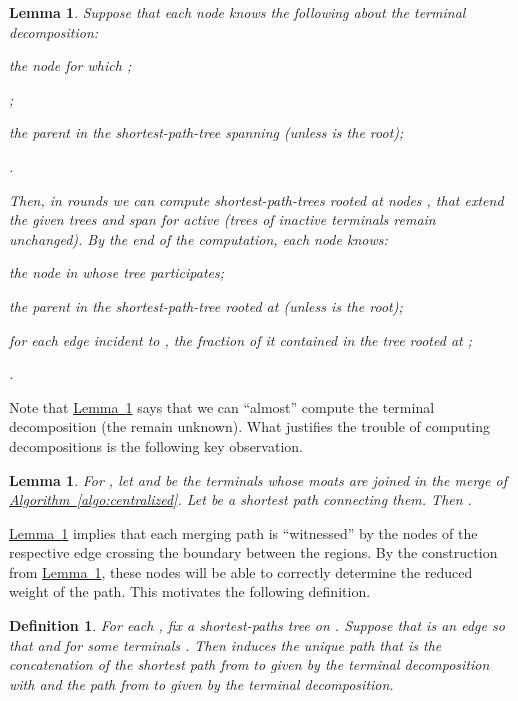 \documentclass[letterpaper,11pt]{article}
\newtheorem{lemma}[theorem]{Lemma}
\newtheorem{definition}[theorem]{Definition}
\newcommand{\namedref}[2]{\hyperref[#2]{#1~\ref*{#2}}}
\newcommand{\lemmaref}[1]{\namedref{Lemma}{#1}}
\newcommand{\algref}[1]{\namedref{Algorithm}{#1}}
\begin{document}
\begin{lemma}\label{lemma:partition}
  Suppose that each node 
knows the
  following about the  terminal decomposition:
  \begin{compactitem}
  \item the node  for which ;
  \item ;
  \item the parent in the shortest-path-tree spanning   (unless
   is the root);
  \item .
  \end{compactitem}
  Then, in  rounds we can compute shortest-path-trees rooted
  at nodes , that extend the given trees and span
 for active  (trees of inactive terminals
remain unchanged). By the end of the computation, each node
knows: \begin{compactitem}
  \item the node  in whose tree  participates;
  \item the parent in the shortest-path-tree rooted at  (unless 
    is the root);
  \item for each edge incident to , the fraction of it contained in
  the tree rooted at ;
  \item .
  \end{compactitem}
\end{lemma}
Note that \lemmaref{lemma:partition} says that we can ``almost'' compute
the  terminal
decomposition (the  remain unknown).
What justifies the trouble of computing decompositions is the
following key observation.


\begin{lemma}\label{lemma:path_in_region}
  For , let  and  be the 
  terminals whose moats are joined in the  merge of
  \algref{algo:centralized}. Let  be a shortest path connecting
  them. Then .
\end{lemma}
\lemmaref{lemma:path_in_region} implies that each merging path is ``witnessed''
by the nodes of the respective edge crossing the boundary between the regions.
By the construction from \lemmaref{lemma:partition}, these nodes will be
able to correctly determine the reduced weight of the path. This
motivates the following 
definition.

\begin{definition}\label{def-induced}
  For each , fix a shortest-paths tree on .
  Suppose that  is an edge so that  and
   for some terminals . Then 
  \emph{induces} the unique path  that is the concatenation of the
  shortest path from  to  given by the terminal decomposition with 
  and the path from  to  given by the terminal decomposition.
\end{definition}
\end{document}
